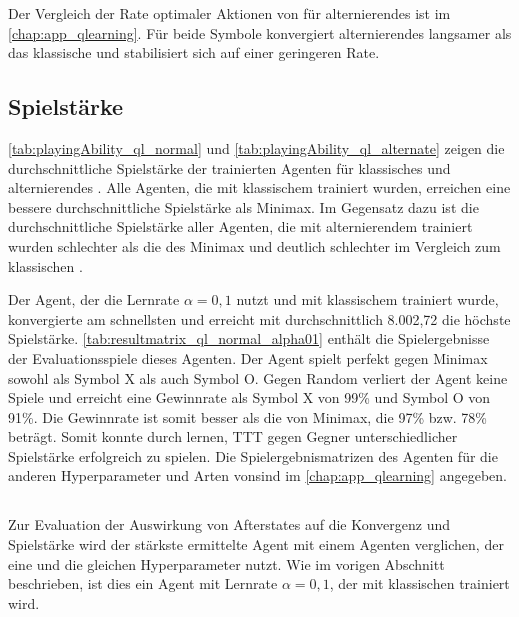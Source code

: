Der Vergleich der Rate optimaler Aktionen von \qlearning für alternierendes \splay ist im \cref{chap:app_qlearning}. 
Für beide Symbole konvergiert alternierendes \splay langsamer als das klassische \splay und stabilisiert sich auf einer geringeren Rate.

\subsection{Spielstärke}

\cref{tab:playingAbility_ql_normal} und \cref{tab:playingAbility_ql_alternate} zeigen die durchschnittliche Spielstärke der trainierten Agenten für klassisches und alternierendes \splay. 
Alle Agenten, die mit klassischem \splay trainiert wurden, erreichen eine bessere durchschnittliche Spielstärke als Minimax. 
Im Gegensatz dazu ist die durchschnittliche Spielstärke aller Agenten, die mit alternierendem \splay trainiert wurden schlechter als die des Minimax und deutlich schlechter im Vergleich zum klassischen \splay.

Der \qlearning Agent, der die Lernrate $\alpha=0,1$ nutzt und mit klassischem \splay trainiert wurde, konvergierte am schnellsten und erreicht mit durchschnittlich 8.002,72 die höchste Spielstärke.
\cref{tab:resultmatrix_ql_normal_alpha01} enthält die Spielergebnisse der Evaluationsspiele dieses Agenten. 
Der Agent spielt perfekt gegen Minimax sowohl als Symbol X als auch Symbol O. 
Gegen Random verliert der Agent keine Spiele und erreicht eine Gewinnrate als Symbol X von 99\% und Symbol O von 91\%. 
Die Gewinnrate ist somit besser als die von Minimax, die 97\% bzw. 78\% beträgt. 
Somit konnte \qlearning durch \splay lernen, \ac{TTT} gegen Gegner unterschiedlicher Spielstärke erfolgreich zu spielen. 
Die Spielergebnismatrizen des \qlearning Agenten für die anderen Hyperparameter und Arten von\splay sind im \cref{chap:app_qlearning} angegeben.





\subsection{\wtable}
Zur Evaluation der Auswirkung von Afterstates auf die Konvergenz und Spielstärke wird der stärkste ermittelte \qlearning Agent mit einem Agenten verglichen, der eine \wtable und die gleichen Hyperparameter nutzt. 
Wie im vorigen Abschnitt beschrieben, ist dies ein \qlearning Agent mit Lernrate $\alpha=0,1$, der mit klassischen \splay trainiert wird.

